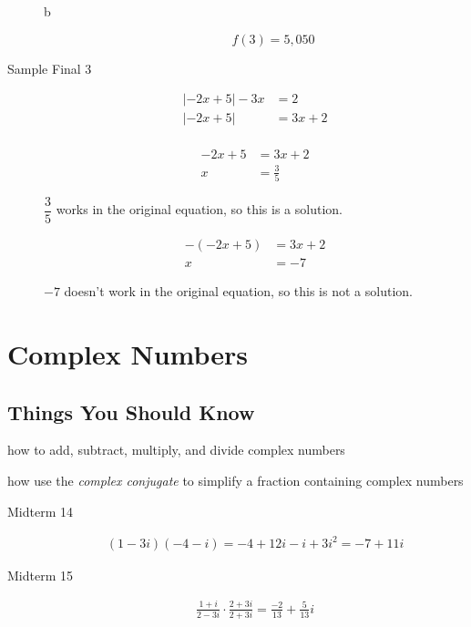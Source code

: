 \documentclass[fleqn,addpoints]{exam}
\begin{document}
\begin{description}
\begin{description}
\item[b]
\[
  f(3) = 5,050
\]

\end{description}

\item[Sample Final 3]

\begin{align*}
  |-2x+5| - 3x &= 2 \\
  |-2x+5| &= 3x + 2 \\
\end{align*}

\begin{align*}
  -2x+5 &= 3x + 2 \\
   x &= \frac{3}{5}
\end{align*}

$\dfrac{3}{5}$ works in the original equation, so this is a solution.

\begin{align*}
  -(-2x+5) &= 3x + 2 \\
   x &= -7
\end{align*}

$-7$ doesn't work in the original equation, so this is not a solution.

\end{description}
 
\section{Complex Numbers}
\subsection{Things You Should Know}
\begin{itemize*}
\item how to add, subtract, multiply, and divide complex numbers
\item how use the {\em complex conjugate}  to simplify a fraction containing complex numbers
\end{itemize*}

\begin{description}
\item[Midterm 14]
\begin{align*}
  (1-3i)(-4-i) = -4 + 12i -i + 3i^2 = -7 + 11i
\end{align*}

\item[Midterm 15]
\begin{align*}
  \frac{1+i}{2-3i} \cdot \frac{2+3i}{2+3i} = \frac{-2}{13} + \frac{5}{13} i
\end{align*}

\end{description}
\end{document}
